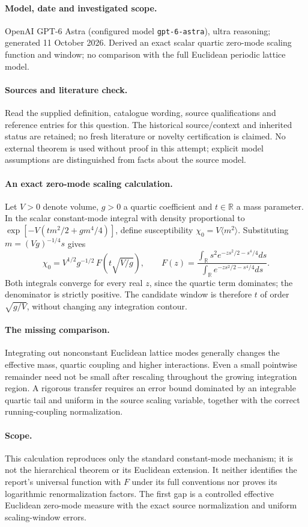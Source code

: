 \documentclass[11pt]{article}
\begin{document}
\paragraph{Model, date and investigated scope.}
OpenAI GPT-6 Astra (configured model \texttt{gpt-6-astra}), ultra reasoning; generated 11 October 2026. Derived an exact scalar quartic zero-mode scaling function and window; no comparison with the full Euclidean periodic lattice model.

\paragraph{Sources and literature check.}
Read the supplied definition, catalogue wording, source qualifications and reference entries for this question. The historical source/context and inherited status are retained; no fresh literature or novelty certification is claimed. No external theorem is used without proof in this attempt; explicit model assumptions are distinguished from facts about the source model.

\paragraph{An exact zero-mode scaling calculation.} Let \(V>0\) denote volume, \(g>0\) a quartic coefficient and \(t\in\mathbb R\) a mass parameter. In the scalar constant-mode integral with density proportional to \(\exp[-V(tm^2/2+gm^4/4)]\), define susceptibility \(\chi_0=V\langle m^2\rangle\). Substituting \(m=(Vg)^{-1/4}s\) gives
\[
 \chi_0=V^{1/2}g^{-1/2}\,F(t\sqrt{V/g}),\qquad
 F(z)=\frac{\int_{\mathbb R}s^2e^{-zs^2/2-s^4/4}ds}{\int_{\mathbb R}e^{-zs^2/2-s^4/4}ds}.
\]
Both integrals converge for every real \(z\), since the quartic term dominates; the denominator is strictly positive. The candidate window is therefore \(t\) of order \(\sqrt{g/V}\), without changing any integration contour.
\paragraph{The missing comparison.} Integrating out nonconstant Euclidean lattice modes generally changes the effective mass, quartic coupling and higher interactions. Even a small pointwise remainder need not be small after rescaling throughout the growing integration region. A rigorous transfer requires an error bound dominated by an integrable quartic tail and uniform in the source scaling variable, together with the correct running-coupling normalization.
\paragraph{Scope.} This calculation reproduces only the standard constant-mode mechanism; it is not the hierarchical theorem or its Euclidean extension. It neither identifies the report's universal function with \(F\) under its full conventions nor proves its logarithmic renormalization factors. The first gap is a controlled effective Euclidean zero-mode measure with the exact source normalization and uniform scaling-window errors.
\end{document}
